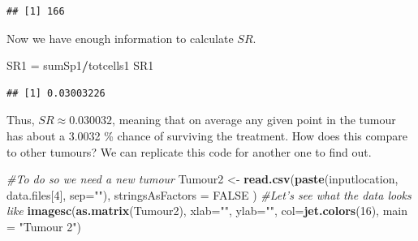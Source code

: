 \documentclass[]{article}
\newenvironment{Shaded}{\begin{snugshade}}{\end{snugshade}}
\newcommand{\KeywordTok}[1]{\textcolor[rgb]{0.13,0.29,0.53}{\textbf{#1}}}
\newcommand{\DataTypeTok}[1]{\textcolor[rgb]{0.13,0.29,0.53}{#1}}
\newcommand{\DecValTok}[1]{\textcolor[rgb]{0.00,0.00,0.81}{#1}}
\newcommand{\StringTok}[1]{\textcolor[rgb]{0.31,0.60,0.02}{#1}}
\newcommand{\CommentTok}[1]{\textcolor[rgb]{0.56,0.35,0.01}{\textit{#1}}}
\newcommand{\OtherTok}[1]{\textcolor[rgb]{0.56,0.35,0.01}{#1}}
\newcommand{\OperatorTok}[1]{\textcolor[rgb]{0.81,0.36,0.00}{\textbf{#1}}}
\newcommand{\NormalTok}[1]{#1}
\begin{document}
\begin{verbatim}
## [1] 166
\end{verbatim}

Now we have enough information to calculate \(SR\).

\begin{Shaded}
\begin{Highlighting}[]
\NormalTok{SR1 =}\StringTok{ }\NormalTok{sumSp1}\OperatorTok{/}\NormalTok{totcells1}
\NormalTok{SR1}
\end{Highlighting}
\end{Shaded}

\begin{verbatim}
## [1] 0.03003226
\end{verbatim}

Thus, \(SR\approx 0.030032\), meaning that on average any given point in
the tumour has about a 3.0032 \% chance of surviving the treatment. How
does this compare to other tumours? We can replicate this code for
another one to find out.

\begin{Shaded}
\begin{Highlighting}[]
\CommentTok{#To do so we need a new tumour}
\NormalTok{Tumour2 <-}\StringTok{ }\KeywordTok{read.csv}\NormalTok{(}\KeywordTok{paste}\NormalTok{(inputlocation, data.files[}\DecValTok{4}\NormalTok{], }\DataTypeTok{sep=}\StringTok{""}\NormalTok{), }\DataTypeTok{stringsAsFactors =} \OtherTok{FALSE}\NormalTok{ )}
\CommentTok{#Let's see what the data looks like}
\KeywordTok{imagesc}\NormalTok{(}\KeywordTok{as.matrix}\NormalTok{(Tumour2), }\DataTypeTok{xlab=}\StringTok{""}\NormalTok{, }\DataTypeTok{ylab=}\StringTok{""}\NormalTok{, }\DataTypeTok{col=}\KeywordTok{jet.colors}\NormalTok{(}\DecValTok{16}\NormalTok{), }\DataTypeTok{main =} \StringTok{"Tumour 2"}\NormalTok{)}
\end{Highlighting}
\end{Shaded}
\end{document}
